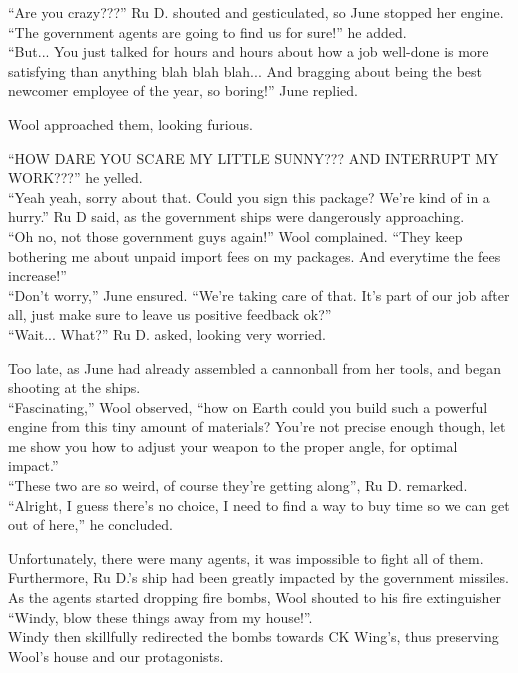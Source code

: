 ``Are you crazy???'' Ru D. shouted and gesticulated, so June stopped her engine. ``The government agents are going to find us for sure!'' he added.\\
``But... You just talked for hours and hours about how a job well-done is more satisfying than anything blah blah blah... And bragging about being the best newcomer employee of the year, so boring!'' June replied.


Wool approached them, looking furious.

``HOW DARE YOU SCARE MY LITTLE SUNNY??? AND INTERRUPT MY WORK???'' he yelled.\\
``Yeah yeah, sorry about that. Could you sign this package? We're kind of in a hurry.'' Ru D said, as the government ships were dangerously approaching.\\
``Oh no, not those government guys again!'' Wool complained. ``They keep bothering me about unpaid import fees on my packages. And everytime the fees increase!''\\
``Don't worry,'' June ensured. ``We're taking care of that. It's part of our job after all, just make sure to leave us positive feedback ok?''\\
``Wait... What?'' Ru D. asked, looking very worried.


Too late, as June had already assembled a cannonball from her tools, and began shooting at the ships.\\
``Fascinating,'' Wool observed, ``how on Earth could you build such a powerful engine from this tiny amount of materials? You're not precise enough though, let me show you how to adjust your weapon to the proper angle, for optimal impact.''\\
``These two are so weird, of course they're getting along'', Ru D. remarked. ``Alright, I guess there's no choice, I need to find a way to buy time so we can get out of here,'' he concluded.


Unfortunately, there were many agents, it was impossible to fight all of them. Furthermore, Ru D.'s ship had been greatly impacted by the government missiles.
As the agents started dropping fire bombs, Wool shouted to his fire extinguisher ``Windy, blow these things away from my house!''. \\ 
Windy then skillfully redirected the bombs towards CK Wing's, thus preserving Wool's house and our protagonists.

